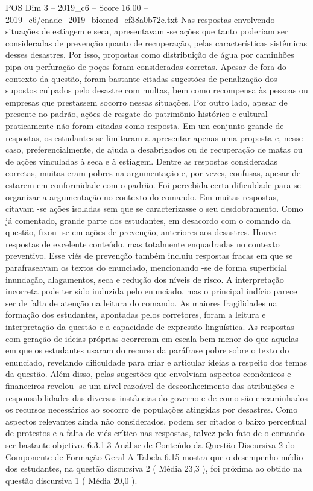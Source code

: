 \begin{textsample}{POS Dim 3 – 2019\_c6 – Score 16.00 – 2019\_c6/enade\_2019\_biomed\_ef38a0b72c.txt}
Nas respostas envolvendo situações de estiagem e seca, apresentavam -se ações que tanto poderiam ser consideradas de prevenção quanto de recuperação, pelas características sistêmicas desses desastres.
Por isso, propostas como distribuição de água por caminhões pipa ou perfuração de poços foram consideradas corretas.
Apesar de fora do contexto da questão, foram bastante citadas sugestões de penalização dos supostos culpados pelo desastre com multas, bem como recompensa às pessoas ou empresas que prestassem socorro nessas situações.
Por outro lado, apesar de presente no padrão, ações de resgate do patrimônio histórico e cultural praticamente não foram citadas como resposta.
Em um conjunto grande de respostas, os estudantes se limitaram a apresentar apenas uma proposta e, nesse caso, preferencialmente, de ajuda a desabrigados ou de recuperação de matas ou de ações vinculadas à seca e à estiagem.
Dentre as respostas consideradas corretas, muitas eram pobres na argumentação e, por vezes, confusas, apesar de estarem em conformidade com o padrão.
Foi percebida certa dificuldade para se organizar a argumentação no contexto do comando.
Em muitas respostas, citavam -se ações isoladas sem que se caracterizasse o seu desdobramento.
Como já comentado, grande parte dos estudantes, em desacordo com o comando da questão, fixou -se em ações de prevenção, anteriores aos desastres.
Houve respostas de excelente conteúdo, mas totalmente enquadradas no contexto preventivo.
Esse viés de prevenção também incluiu respostas fracas em que se parafraseavam os textos do enunciado, mencionando -se de forma superficial inundação, alagamentos, seca e redução dos níveis de risco.
A interpretação incorreta pode ter sido induzida pelo enunciado, mas o principal indício parece ser de falta de atenção na leitura do comando.
As maiores fragilidades na formação dos estudantes, apontadas pelos corretores, foram a leitura e interpretação da questão e a capacidade de expressão linguística.
As respostas com geração de ideias próprias ocorreram em escala bem menor do que aquelas em que os estudantes usaram do recurso da paráfrase pobre sobre o texto do enunciado, revelando dificuldade para criar e articular ideias a respeito dos temas da questão.
Além disso, pelas sugestões que envolviam aspectos econômicos e financeiros revelou -se um nível razoável de desconhecimento das atribuições e responsabilidades das diversas instâncias do governo e de como são encaminhados os recursos necessários ao socorro de populações atingidas por desastres.
Como aspectos relevantes ainda não considerados, podem ser citados o baixo percentual de protestos e a falta de viés crítico nas respostas, talvez pelo fato de o comando ser bastante objetivo. 6.3.1.3 Análise de Conteúdo da Questão Discursiva 2 do Componente de Formação Geral A Tabela 6.15 mostra que o desempenho médio dos estudantes, na questão discursiva 2 ( Média 23,3 ), foi próxima ao obtido na questão discursiva 1 ( Média 20,0 ).

\end{textsample}
